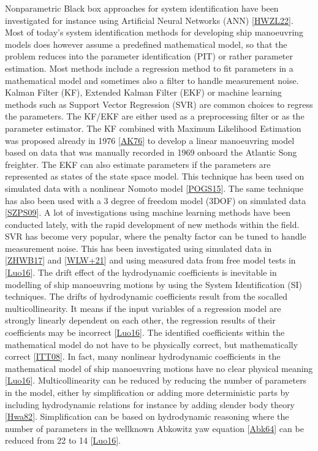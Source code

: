 \documentclass[review]{elsarticle}
\begin{document}
\sphinxAtStartPar
Nonparametric Black box approaches for system identification have been investigated for instance using Artificial Neural Networks (ANN) {[}\hyperlink{cite.bibligraphy:id82}{HWZL22}{]}. Most of today’s system identification methods for developing ship manoeuvring models does however assume a pre\sphinxhyphen{}defined mathematical model, so that the problem reduces into the parameter identification (PIT) or rather parameter estimation. Most methods include a regression method to fit parameters in a mathematical model and sometimes also a filter to handle measurement noise.
Kalman Filter (KF), Extended Kalman Filter (EKF) or machine learning methods such as Support Vector Regression (SVR) are common choices to regress the parameters. The KF/EKF are either used as a pre\sphinxhyphen{}processing filter or as the parameter estimator. The KF combined with Maximum Likelihood Estimation was proposed already in 1976 {[}\hyperlink{cite.bibligraphy:id30}{AK76}{]} to develop a linear manoeuvring model based on data that was manually recorded in 1969 onboard the Atlantic Song freighter. The EKF can also estimate parameters if the parameters are represented as states of the state space model. This technique has been used on simulated data with a nonlinear Nomoto model {[}\hyperlink{cite.bibligraphy:id33}{POGS15}{]}. The same technique has also been used with a 3 degree of freedom model (3DOF) on simulated data {[}\hyperlink{cite.bibligraphy:id54}{SZPS09}{]}.
A lot of investigations using machine learning methods have been conducted lately, with the rapid development of new methods within the field. SVR has become very popular, where the penalty factor can be tuned to handle measurement noise. This has been investigated using simulated data in {[}\hyperlink{cite.bibligraphy:id38}{ZHWB17}{]} and {[}\hyperlink{cite.bibligraphy:id47}{WLW+21}{]} and using measured data from free model tests in {[}\hyperlink{cite.bibligraphy:id56}{Luo16}{]}.
The drift effect of the hydrodynamic coefficients is inevitable in modelling of ship manoeuvring motions by using the System Identification (SI) techniques. The drifts of hydrodynamic coefficients result from the so\sphinxhyphen{}called multicollinearity. It means if the input variables of a regression model are strongly linearly dependent on each other, the regression results of their coefficients may be incorrect {[}\hyperlink{cite.bibligraphy:id56}{Luo16}{]}. The identified coefficients within the mathematical model do not have to be physically correct, but mathematically correct {[}\hyperlink{cite.bibligraphy:id75}{ITT08}{]}. In fact, many nonlinear hydrodynamic coefficients in the mathematical model of ship manoeuvring motions have no clear physical meaning {[}\hyperlink{cite.bibligraphy:id56}{Luo16}{]}. Multicollinearity can be reduced by reducing the number of parameters in the model, either by simplification or adding more deterministic parts by including hydrodynamic relations for instance by adding slender body theory {[}\hyperlink{cite.bibligraphy:id80}{Hwa82}{]}. Simplification can be based on hydrodynamic reasoning where the number of parameters in the well\sphinxhyphen{}known Abkowitz yaw equation {[}\hyperlink{cite.bibligraphy:id25}{Abk64}{]} can be reduced from 22 to 14 {[}\hyperlink{cite.bibligraphy:id56}{Luo16}{]}.
\end{document}
